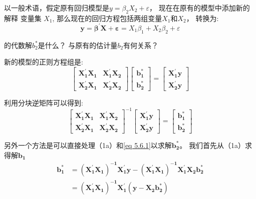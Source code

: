 以一般术语，假定原有回归模型是$ y = \beta_{2} X_{2} + \varepsilon $， 现在在原有的模型中添加新的解释 变量集 $ X_1 $,
那么现在的回归方程包括两组变量$ X_1 $和$ X_2 $， 转换为:
$$ \boldsymbol{ y = \beta^{\prime} X +\varepsilon} = X_{1} \beta_{1}+X_{2} \beta_{2}+\varepsilon $$ 

的代数解$ b_2^{*}$是什么？ 与原有的估计量$ b_{2} $有何关系？

新的模型的正则方程组是:
\begin{equation}
    \left[\begin{array}{cc}
        \boldsymbol{ X_{1}^{\prime} X_{1}} & \boldsymbol{ X_{1}^{\prime} X_{2} } \\
        \boldsymbol{ X_{2}^{\prime} X_{1}} & \boldsymbol{ X_{2}^{\prime} X_{2} }
        \end{array}\right]\left[\begin{array}{l}
            \boldsymbol{ b_{1}^{*} } \\
            \boldsymbol{ b_{2}^{*} }
        \end{array}\right]=\left[\begin{array}{c}
            \boldsymbol{ X_{1}^{\prime} y } \\
            \boldsymbol{ X_{2}^{\prime} y }
        \end{array}\right]
    \label{eq 5.6.1}
\end{equation}

利用分块逆矩阵可以得到:
$$ \left[\begin{array}{cc}
    \boldsymbol{ X_{1}^{\prime} X_{1} } & \boldsymbol{ X_{1}^{\prime} X_{2} } \\
    \boldsymbol{ X_{2}^{\prime} X_{1} } & \boldsymbol{ X_{2}^{\prime} X_{2} }
    \end{array}\right]^{-1}\left[\begin{array}{c}
        \boldsymbol{ X_{1}^{\prime} y } \\
        \boldsymbol{ X_{2}^{\prime} y }
    \end{array}\right]=\left[\begin{array}{c}
        \boldsymbol{ b_{1}^{*} } \\
        \boldsymbol{ b_{2}^{*} }
    \end{array}\right] $$

另外一个方法是可以直接处理（1a）和\ref{eq 5.6.1}以求解$ \boldsymbol{  b_2^{*} }$。 我们首先从（1a）求得解$ \boldsymbol{ b_1 } $
\begin{equation}
    \begin{aligned}
        \boldsymbol{ b_{1}^{*}}  
        & = \boldsymbol{ \left(X_{1}^{\prime} X_{1}\right)^{-1} X_{1}^{\prime} y-\left(X_{1}^{\prime} X_{1}\right)^{-1} X_{1}^{\prime} X_{2} b_{2}^{*} } \\ 
        & = \boldsymbol{ \left(X_{1}^{\prime} X_{1}\right)^{-1} X_{1}^{\prime}\left(y-X_{2} b_{2}^{*}\right) }
    \end{aligned}
    \label{eq 5.6.2}
\end{equation}

